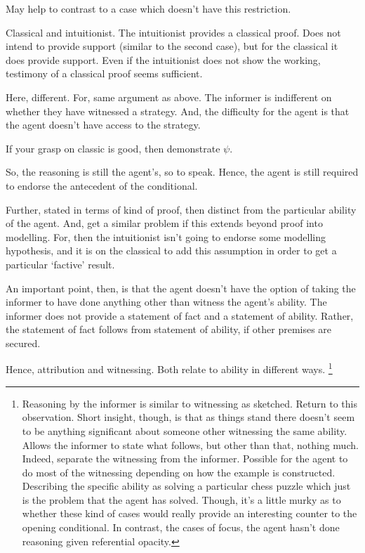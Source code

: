 \documentclass[10pt]{article}
\newcommand{\hozlinedash}[0]{%
  \noindent\hdashrule[0.5ex][c]{\textwidth}{.1pt}{2.5pt}
}
\begin{document}
\begin{note}
  May help to contrast to a case which doesn't have this restriction.

  Classical and intuitionist.
  The intuitionist provides a classical proof.
  Does not intend to provide support (similar to the second case), but for the classical it does provide support.
  Even if the intuitionist does not show the working, testimony of a classical proof seems sufficient.

  Here, different.
  For, same argument as above.
  The informer is indifferent on whether they have witnessed a strategy.
  And, the difficulty for the agent is that the agent doesn't have access to the strategy.

  If your grasp on classic is good, then demonstrate \(\psi\).

  So, the reasoning is still the agent's, so to speak.
  Hence, the agent is still required to endorse the antecedent of the conditional.

  Further, stated in terms of kind of proof, then distinct from the particular ability of the agent.
  And, get a similar problem if this extends beyond proof into modelling.
  For, then the intuitionist isn't going to endorse some modelling hypothesis, and it is on the classical to add this assumption in order to get a particular `factive' result.

  \hozlinedash

  An important point, then, is that the agent doesn't have the option of taking the informer to have done anything other than witness the agent's ability.
  The informer does not provide a statement of fact and a statement of ability.
  Rather, the statement of fact follows from statement of ability, if other premises are secured.

  Hence, attribution and witnessing.
  Both relate to ability in different ways.\nolinebreak
  \footnote{
    Reasoning by the informer is similar to witnessing as sketched.
    Return to this observation.
    Short insight, though, is that as things stand there doesn't seem to be anything significant about someone other witnessing the same ability.
    Allows the informer to state what follows, but other than that, nothing much.
    Indeed, separate the witnessing from the informer.
    Possible for the agent to do most of the witnessing depending on how the example is constructed.
    Describing the specific ability as solving a particular chess puzzle which just is the problem that the agent has solved.
    Though, it's a little murky as to whether these kind of cases would really provide an interesting counter to the opening conditional.
    In contrast, the cases of focus, the agent hasn't done reasoning given referential opacity.
  }
\end{note}
\end{document}
